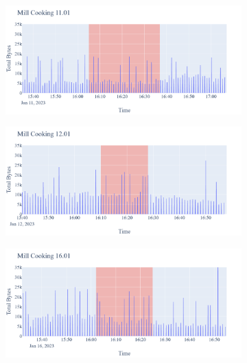 \begin{figure}[H]
\begin{subfigure}[b]{0.5\textwidth}
    \end{subfigure}
    \begin{subfigure}[b]{0.5\textwidth}
        \centering
        \includegraphics[width=1.2\hsize]{figures/Mill_Cooking_Bytes_11.01.png}
    \end{subfigure}
    \begin{subfigure}[b]{0.5\textwidth}
        \centering
        \includegraphics[width=1.2\hsize]{figures/Mill_Cooking_Bytes_12.01.png}
    \end{subfigure}
    \begin{subfigure}[b]{0.5\textwidth}
        \centering
        \includegraphics[width=1.2\hsize]{figures/Mill_Cooking_Bytes_16.01.png}
    \end{subfigure}
    \begin{subfigure}[b]{0.5\textwidth}

\end{subfigure}
\end{figure}
